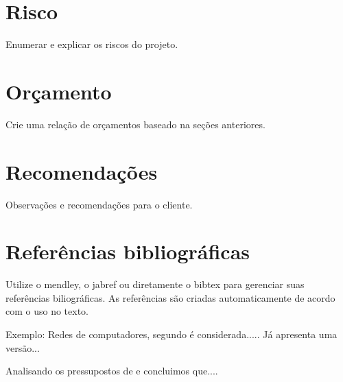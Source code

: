 \documentclass[	DIV=calc,%
							paper=a4,%
							fontsize=12pt,%
							onecolumn]{scrartcl}	 					%
\begin{document}
\section{Risco}
Enumerar e explicar os riscos do projeto.

\section{Orçamento}
Crie uma relação de orçamentos baseado na seções anteriores.

\section{Recomendações}
Observações e recomendações para o cliente.

\section{Referências bibliográficas}
Utilize o mendley, o jabref ou diretamente o bibtex para gerenciar suas referências biliográficas. As referências são criadas automaticamente de acordo com o uso no texto.

Exemplo: Redes de computadores, segundo \cite{t2013} é considerada..... Já \cite{kurose2010} apresenta uma versão...

Analisando os pressupostos de \cite{ref3} e \cite{ref4} concluimos que....


\renewcommand\refname{} %

  
\end{document}
